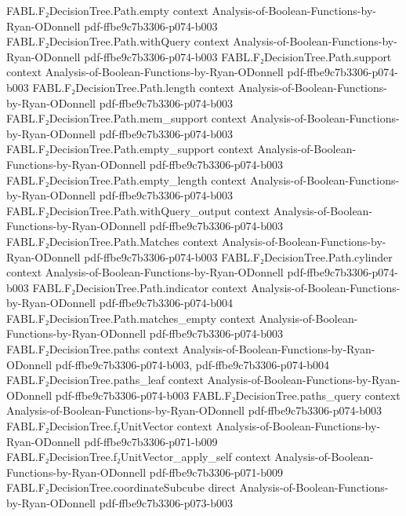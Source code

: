 \begin{theorem}
\proofstep
  {FABL.F₂DecisionTree.Path.empty}
  {context}
  {Analysis-of-Boolean-Functions-by-Ryan-ODonnell}
  {pdf-ffbe9c7b3306-p074-b003}
\proofstep
  {FABL.F₂DecisionTree.Path.withQuery}
  {context}
  {Analysis-of-Boolean-Functions-by-Ryan-ODonnell}
  {pdf-ffbe9c7b3306-p074-b003}
\proofstep
  {FABL.F₂DecisionTree.Path.support}
  {context}
  {Analysis-of-Boolean-Functions-by-Ryan-ODonnell}
  {pdf-ffbe9c7b3306-p074-b003}
\proofstep
  {FABL.F₂DecisionTree.Path.length}
  {context}
  {Analysis-of-Boolean-Functions-by-Ryan-ODonnell}
  {pdf-ffbe9c7b3306-p074-b003}
\proofstep
  {FABL.F₂DecisionTree.Path.mem_support}
  {context}
  {Analysis-of-Boolean-Functions-by-Ryan-ODonnell}
  {pdf-ffbe9c7b3306-p074-b003}
\proofstep
  {FABL.F₂DecisionTree.Path.empty_support}
  {context}
  {Analysis-of-Boolean-Functions-by-Ryan-ODonnell}
  {pdf-ffbe9c7b3306-p074-b003}
\proofstep
  {FABL.F₂DecisionTree.Path.empty_length}
  {context}
  {Analysis-of-Boolean-Functions-by-Ryan-ODonnell}
  {pdf-ffbe9c7b3306-p074-b003}
\proofstep
  {FABL.F₂DecisionTree.Path.withQuery_output}
  {context}
  {Analysis-of-Boolean-Functions-by-Ryan-ODonnell}
  {pdf-ffbe9c7b3306-p074-b003}
\proofstep
  {FABL.F₂DecisionTree.Path.Matches}
  {context}
  {Analysis-of-Boolean-Functions-by-Ryan-ODonnell}
  {pdf-ffbe9c7b3306-p074-b003}
\proofstep
  {FABL.F₂DecisionTree.Path.cylinder}
  {context}
  {Analysis-of-Boolean-Functions-by-Ryan-ODonnell}
  {pdf-ffbe9c7b3306-p074-b003}
\proofstep
  {FABL.F₂DecisionTree.Path.indicator}
  {context}
  {Analysis-of-Boolean-Functions-by-Ryan-ODonnell}
  {pdf-ffbe9c7b3306-p074-b004}
\proofstep
  {FABL.F₂DecisionTree.Path.matches_empty}
  {context}
  {Analysis-of-Boolean-Functions-by-Ryan-ODonnell}
  {pdf-ffbe9c7b3306-p074-b003}
\proofstep
  {FABL.F₂DecisionTree.paths}
  {context}
  {Analysis-of-Boolean-Functions-by-Ryan-ODonnell}
  {pdf-ffbe9c7b3306-p074-b003,
    pdf-ffbe9c7b3306-p074-b004}
\proofstep
  {FABL.F₂DecisionTree.paths_leaf}
  {context}
  {Analysis-of-Boolean-Functions-by-Ryan-ODonnell}
  {pdf-ffbe9c7b3306-p074-b003}
\proofstep
  {FABL.F₂DecisionTree.paths_query}
  {context}
  {Analysis-of-Boolean-Functions-by-Ryan-ODonnell}
  {pdf-ffbe9c7b3306-p074-b003}
\proofstep
  {FABL.F₂DecisionTree.f₂UnitVector}
  {context}
  {Analysis-of-Boolean-Functions-by-Ryan-ODonnell}
  {pdf-ffbe9c7b3306-p071-b009}
\proofstep
  {FABL.F₂DecisionTree.f₂UnitVector_apply_self}
  {context}
  {Analysis-of-Boolean-Functions-by-Ryan-ODonnell}
  {pdf-ffbe9c7b3306-p071-b009}
\proofstep
  {FABL.F₂DecisionTree.coordinateSubcube}
  {direct}
  {Analysis-of-Boolean-Functions-by-Ryan-ODonnell}
  {pdf-ffbe9c7b3306-p073-b003}

\end{theorem}
